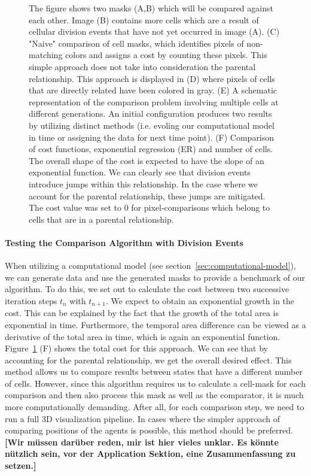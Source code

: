 \documentclass{article}
\begin{document}
\begin{figure}[H]
    \caption{
        The figure shows two masks (A,B) which will be compared against each other.
        Image (B) contains more cells which are a result of cellular division events that have not
        yet occurred in image (A).
        (C) "Naive" comparison of cell masks, which identifies pixels of non-matching colors and
        assigns a cost by counting these pixels.
        This simple approach does not take into consideration the parental relationship.
        This approach is displayed in (D) where pixels of cells that are directly related have been
        colored in gray.
        (E) A schematic representation of the comparison problem involving multiple cells at
        different generations.
        An initial configuration produces two results by utilizing distinct methods (i.e. evoling
        our computational model in time or assigning the data for next time point).
        (F) Comparison of cost functions, exponential regression (ER) and number of cells.
        The overall shape of the cost is expected to have the slope of an exponential function.
        We can clearly see that division events introduce jumps within this relationship.
        In the case where we account for the parental relationship, these jumps are mitigated.
        The cost value was set to $0$ for pixel-comparisons which belong to cells that are in a
        parental relationship.
    }
    \label{fig:mask-difference-metric}
\end{figure}

\paragraph{Testing the Comparison Algorithm with Division Events}
When utilizing a computational model (see section~\ref{sec:computational-model}), we can generate
data and use the generated masks to provide a benchmark of our algorithm.
To do this, we set out to calculate the cost between two successive iteration steps
$t_n$ with $t_{n+1}$.
We expect to obtain an exponential growth in the cost.
This can be explained by the fact that the growth of the total area is exponential in time.
Furthermore, the temporal area difference can be viewed as a derivative of the total area in time,
which is again an exponential function.
Figure~\ref{fig:mask-difference-metric} (F) shows the total cost for this approach.
We can see that by accounting for the parental relationship, we get the overall desired effect.
This method allows us to compare results between states that have a different number of cells.
However, since this algorithm requires us to calculate a cell-mask for each comparison and then also
process this mask as well as the comparator, it is much more computationally demanding.
After all, for each comparison step, we need to run a full 3D visualization pipeline.
In cases where the simpler approach of comparing positions of the agents is possible, this method
should be preferred.
\textbf{[Wir müssen darüber reden, mir ist hier vieles unklar. Es könnte nützlich sein, vor der Application Sektion, eine Zusammenfassung zu setzen.]}
\end{document}
